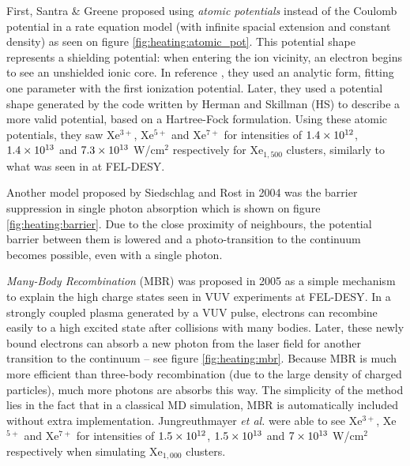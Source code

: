 First, Santra \& Greene proposed using \textit{atomic potentials} instead of
the Coulomb potential in a rate equation model (with infinite spacial
extension and
constant density) as seen on figure \ref{fig:heating:atomic_pot}.
This potential shape represents a shielding potential: when
entering the ion vicinity, an electron begins to see an unshielded ionic core.
In reference \cite{Greene2003}, they used an analytic form, fitting one
parameter
with the first ionization potential. Later\cite{Walters2006}, they used a
potential shape generated by the code written by Herman and
Skillman\cite{HS1963} (HS) to describe a more valid potential, based on a
Hartree-Fock formulation. Using these atomic potentials, they saw Xe$^{3+}$,
Xe$^{5+}$ and Xe$^{7+}$ for intensities of $\ten{1.4}{12}$, $\ten{1.4}{13}$ and
$\ten{7.3}{13}$ W/cm$^2$ respectively for Xe$_{1,500}$ clusters, similarly to
what was seen in at FEL-DESY.

Another model proposed by Siedschlag and Rost\cite{Siedschlag2004} in 2004 was
the barrier suppression in single photon absorption which is shown on figure
\ref{fig:heating:barrier}. Due to the close proximity
of neighbours, the potential barrier between them is lowered and
a photo-transition to the continuum becomes possible, even with a single photon.

\textit{Many-Body Recombination} (MBR) was proposed in 2005
as a simple mechanism to explain the high charge states seen in VUV
experiments at FEL-DESY\cite{Jungreuthmayer2005}. In a strongly coupled plasma
generated by a VUV pulse, electrons can recombine easily to a high excited
state after collisions with many bodies. Later, these newly bound electrons can
absorb a new photon from the laser field for another transition to the
continuum -- see figure \ref{fig:heating:mbr}.
Because MBR is much more efficient than three-body
recombination (due to the large density of charged particles), much more
photons are absorbs this way. The simplicity of the
method lies in the fact that in a classical MD simulation, MBR is automatically
included without extra implementation. Jungreuthmayer \textit{et al.} were able
to see Xe$^{3+}$, Xe$^{5+}$ and Xe$^{7+}$ for intensities of $\ten{1.5}{12}$,
$\ten{1.5}{13}$ and $\ten{7}{13}$ W/cm$^2$ respectively when simulating
Xe$_{1,000}$ clusters.


